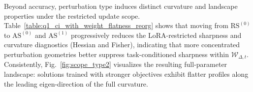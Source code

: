 \documentclass{article}
\theoremstyle{plain}
\theoremstyle{definition}
\theoremstyle{remark}
\begin{document}
Beyond accuracy, perturbation type induces distinct curvature and landscape properties under the restricted update scope.
Table~\ref{table:q1_ci_with_weight_flatness_reorg} shows that moving from $\mathrm{RS}^{(0)}$ to $\mathrm{AS}^{(0)}$ and $\mathrm{AS}^{(1)}$ progressively reduces the LoRA-restricted sharpness and curvature diagnostics (Hessian and Fisher), indicating that more concentrated perturbation geometries better suppress task-conditioned sharpness within $\mathcal W_{\Delta,t}$.
Consistently, Fig.~\ref{fig:scope_type2} visualizes the resulting {full-parameter} landscape: solutions trained with stronger objectives exhibit flatter profiles along the leading eigen-direction of the full curvature.

\end{document}
